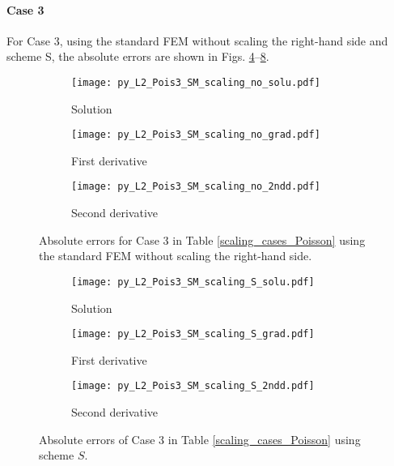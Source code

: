 \documentclass[review,3p]{elsarticle}
\begin{document}
\paragraph{Case 3}
For Case 3, using the standard FEM without scaling the right-hand side and scheme S, the absolute errors are shown in Figs. \ref{py_L2_Pois3_SM_scaling_no}--\ref{py_L2_Pois3_SM_scaling_S}.

\begin{figure}[!ht]
    \begin{subfigure}{5.5cm}
        \texttt{[image: py\_L2\_Pois3\_SM\_scaling\_no\_solu.pdf]}
        \caption{Solution}
        \label{py_L2_Pois3_SM_scaling_no_solu}
    \end{subfigure}
    \hspace{-0.2cm}
    \begin{subfigure}{5.5cm}
        \texttt{[image: py\_L2\_Pois3\_SM\_scaling\_no\_grad.pdf]}
        \caption{First derivative}
        \label{py_L2_Pois3_SM_scaling_no_grad}
    \end{subfigure}
    \hspace{-0.2cm}
    \begin{subfigure}{5.5cm}
        \texttt{[image: py\_L2\_Pois3\_SM\_scaling\_no\_2ndd.pdf]}
        \caption{Second derivative}
        \label{py_L2_Pois3_SM_scaling_no_2ndd}
    \end{subfigure}
\caption{Absolute errors for Case 3 in Table \ref{scaling_cases_Poisson} using the standard FEM without scaling the right-hand side.}
\label{py_L2_Pois3_SM_scaling_no}
\end{figure}

\begin{figure}[!ht]
    \begin{subfigure}{5.5cm}
        \texttt{[image: py\_L2\_Pois3\_SM\_scaling\_S\_solu.pdf]}
        \caption{Solution}
        \label{py_L2_Pois3_SM_scaling_S_solu}
    \end{subfigure}
    \hspace{-0.2cm}
    \begin{subfigure}{5.5cm}
        \texttt{[image: py\_L2\_Pois3\_SM\_scaling\_S\_grad.pdf]}
        \caption{First derivative}
        \label{py_L2_Pois3_SM_scaling_S_grad}
    \end{subfigure}
    \hspace{-0.2cm}
    \begin{subfigure}{5.5cm}
        \texttt{[image: py\_L2\_Pois3\_SM\_scaling\_S\_2ndd.pdf]}
        \caption{Second derivative}
        \label{py_L2_Pois3_SM_scaling_S_2ndd}
    \end{subfigure}
\caption{Absolute errors of Case 3 in Table \ref{scaling_cases_Poisson} using scheme $S$.}
\label{py_L2_Pois3_SM_scaling_S}
\end{figure}
\end{document}
